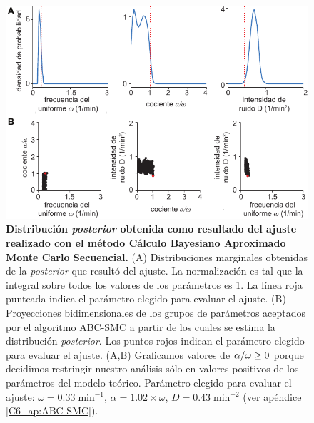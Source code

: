 \documentclass[./main.tex]{subfiles}
\begin{document}
\begin{figure}
    \centering
    \includegraphics[width=1\columnwidth]{figures/chapter6/C6_fit_refval.pdf} 
    \caption{\textbf{Distribución \textit{posterior} obtenida como resultado del ajuste realizado con el método Cálculo Bayesiano Aproximado Monte Carlo Secuencial.} (A) Distribuciones marginales obtenidas de la \textit{posterior} que resultó del ajuste. La normalización es tal que la integral sobre todos los valores de los parámetros es 1. La línea roja punteada indica el parámetro elegido para evaluar el ajuste. (B) Proyecciones bidimensionales de los grupos de parámetros aceptados por el algoritmo ABC-SMC a partir de los cuales se estima la distribución \textit{posterior}. Los puntos rojos indican el parámetro elegido para evaluar el ajuste. (A,B) Graficamos valores de $\alpha/\omega \geq 0$ porque decidimos restringir nuestro análisis sólo en valores positivos de los parámetros del modelo teórico. Parámetro elegido para evaluar el ajuste: $\omega = 0.33 \;\text{min}^{-1}$, $\alpha = 1.02 \times \omega$, $ D = 0.43 \; \text{min}^{-2}$ (ver apéndice \ref{C6_ap:ABC-SMC}).}
    \label{C6_fig:fit}
\end{figure} 
\end{document}
